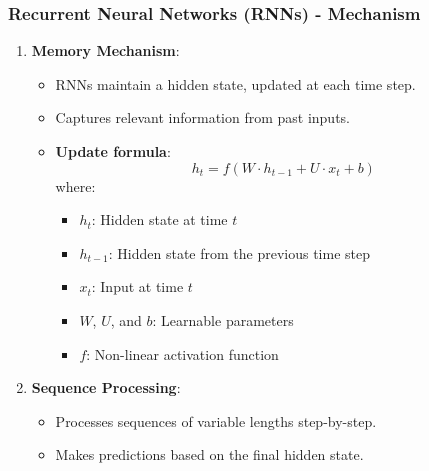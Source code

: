 \documentclass[aspectratio=169]{beamer}
\begin{document}
\begin{frame}[fragile]
    \frametitle{Recurrent Neural Networks (RNNs) - Mechanism}
    \begin{enumerate}
        \item \textbf{Memory Mechanism}:
        \begin{itemize}
            \item RNNs maintain a hidden state, updated at each time step.
            \item Captures relevant information from past inputs.
            \item \textbf{Update formula}:
            \begin{equation}
            h_t = f(W \cdot h_{t-1} + U \cdot x_t + b)
            \end{equation}
            where:
            \begin{itemize}
                \item $h_t$: Hidden state at time $t$
                \item $h_{t-1}$: Hidden state from the previous time step
                \item $x_t$: Input at time $t$
                \item $W$, $U$, and $b$: Learnable parameters
                \item $f$: Non-linear activation function
            \end{itemize}
        \end{itemize}
        \item \textbf{Sequence Processing}:
        \begin{itemize}
            \item Processes sequences of variable lengths step-by-step.
            \item Makes predictions based on the final hidden state.
        \end{itemize}
    \end{enumerate}
\end{frame}
\end{document}
